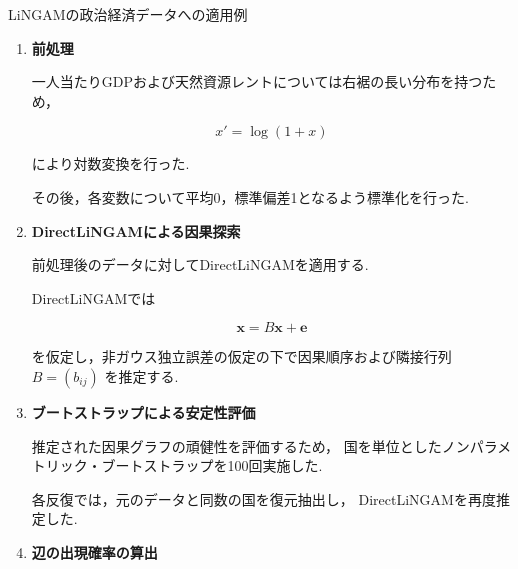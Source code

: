 \documentclass[uplatex, dvipdfmx]{jsarticle}
\begin{document}
\begin{exm}{LiNGAMの政治経済データへの適用例}
\begin{enumerate}
    \begin{itemize}
        \item 一人当たりGDP（PPP）
        \item 天然資源レント（GDP比）
        \item インターネット利用率
    \end{itemize}

    また，V-Demより以下の政治・制度指標を取得した.

    \begin{itemize}
        \item Social Equality
        \item Democracy
        \item Property Rights
        \item Physical Freedom
        \item Political Corruption
        \item Education Equality
    \end{itemize}

    両データを国コードで結合し，欠損値を含む国を除外した158ヶ国で解析を行う.

    \item \textbf{前処理}

    一人当たりGDPおよび天然資源レントについては右裾の長い分布を持つため，

    \[
    x'=\log(1+x)
    \]

    により対数変換を行った.

    その後，各変数について平均0，標準偏差1となるよう標準化を行った.

    \item \textbf{DirectLiNGAMによる因果探索}

    前処理後のデータに対してDirectLiNGAMを適用する.

    DirectLiNGAMでは

    \[
    \mathbf{x}=B\mathbf{x}+\mathbf{e}
    \]

    を仮定し，非ガウス独立誤差の仮定の下で因果順序および隣接行列
    \(B=(b_{ij})\) を推定する.

    \item \textbf{ブートストラップによる安定性評価}

    推定された因果グラフの頑健性を評価するため，
    国を単位としたノンパラメトリック・ブートストラップを100回実施した.

    各反復では，元のデータと同数の国を復元抽出し，
    DirectLiNGAMを再度推定した.

    \item \textbf{辺の出現確率の算出}


\end{enumerate}
\end{exm}
\end{document}
